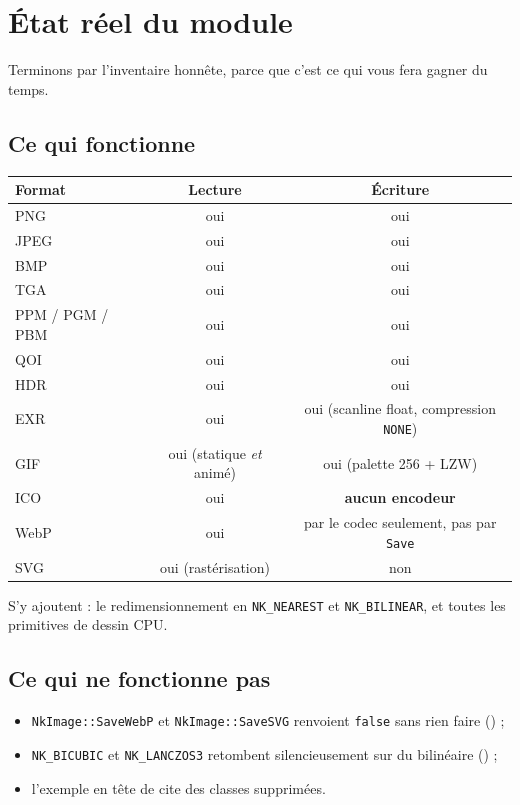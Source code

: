 \section{État réel du module}

Terminons par l'inventaire honnête, parce que c'est ce qui vous fera gagner du
temps.

\subsection{Ce qui fonctionne}

\begin{center}
\begin{tabular}{@{}lcc@{}}
\toprule
\textbf{Format} & \textbf{Lecture} & \textbf{Écriture} \\
\midrule
PNG   & oui & oui \\
JPEG  & oui & oui \\
BMP   & oui & oui \\
TGA   & oui & oui \\
PPM / PGM / PBM & oui & oui \\
QOI   & oui & oui \\
HDR   & oui & oui \\
EXR   & oui & oui (scanline float, compression \texttt{NONE}) \\
GIF   & oui (statique \emph{et} animé) & oui (palette 256 + LZW) \\
ICO   & oui & \textbf{aucun encodeur} \\
WebP  & oui & par le codec seulement, pas par \texttt{Save} \\
SVG   & oui (rastérisation) & non \\
\bottomrule
\end{tabular}
\end{center}

S'y ajoutent : le redimensionnement en \texttt{NK\_NEAREST} et
\texttt{NK\_BILINEAR}, et toutes les primitives de dessin CPU.

\subsection{Ce qui ne fonctionne pas}

\begin{itemize}
  \item \texttt{NkImage::SaveWebP} et \texttt{NkImage::SaveSVG} renvoient
        \texttt{false} sans rien faire () ;
  \item \texttt{NK\_BICUBIC} et \texttt{NK\_LANCZOS3} retombent silencieusement
        sur du bilinéaire () ;
  \item l'exemple en tête de  cite des classes
        supprimées.
\end{itemize}

